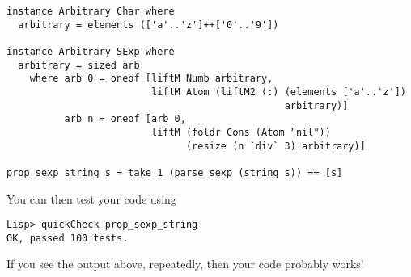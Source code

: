 \documentclass{article}
\begin{document}
\begin{enumerate}
\begin{verbatim}
instance Arbitrary Char where
  arbitrary = elements (['a'..'z']++['0'..'9'])

instance Arbitrary SExp where
  arbitrary = sized arb
    where arb 0 = oneof [liftM Numb arbitrary, 
                         liftM Atom (liftM2 (:) (elements ['a'..'z'])
                                                arbitrary)]
          arb n = oneof [arb 0, 
                         liftM (foldr Cons (Atom "nil")) 
                               (resize (n `div` 3) arbitrary)]

prop_sexp_string s = take 1 (parse sexp (string s)) == [s]
\end{verbatim}
You can then test your code using
\begin{verbatim}
Lisp> quickCheck prop_sexp_string
OK, passed 100 tests.
\end{verbatim}
If you see the output above, repeatedly, then your code probably works!
\end{enumerate}
\end{document}
